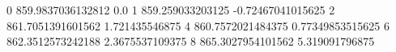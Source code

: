 0 859.9837036132812 0.0
1 859.259033203125 -0.72467041015625
2 861.7051391601562 1.721435546875
4 860.7572021484375 0.77349853515625
6 862.3512573242188 2.3675537109375
8 865.3027954101562 5.319091796875
